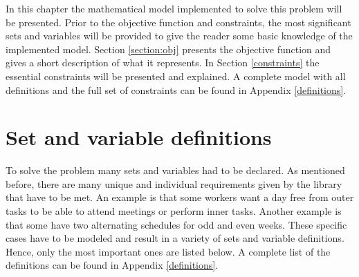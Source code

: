 In this chapter the mathematical model implemented to solve this problem will be presented. Prior to the objective function and constraints, the most significant sets and variables will be provided to give the reader some basic knowledge of the implemented model. Section \ref{section:obj} presents the objective function and gives a short description of what it represents. In Section \ref{constraints} the essential constraints will be presented and explained. A complete model with all definitions and the full set of constraints can be found in Appendix \ref{definitions}. %
\section{Set and variable definitions} \label{variables}
To solve the problem many sets and variables had to be declared. As mentioned before, there are many unique and individual requirements given by the library that have to be met. An example is that some workers want a day free from outer tasks to be able to attend meetings or perform inner tasks. Another example is that some have two alternating schedules for odd and even weeks. These specific cases have to be modeled and result in a variety of sets and variable definitions. Hence, only the most important ones are listed below. A complete list of the definitions can be found in Appendix \ref{definitions}. \\
 \\
  \\
	 	\\
                  \\
	 \\
                            \\
	 \\
                    \\
                \\
               \\

